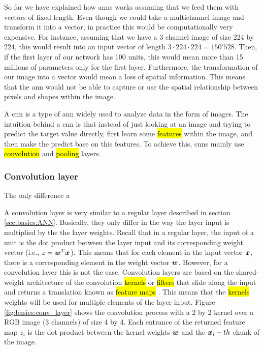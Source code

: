 
\glsresetall

\graphicspath{{./Sections/Basics/Resources/}}

So far we have explained how \glspl{ann} works assuming that we feed them with vectors of fixed length. Even though we could take a multichannel image and transform it into a vector, in practice this would be computationally very expensive. For instance, assuming that we have a 3 channel image of size 224 by 224, this would result into an input vector of length $3 \cdot 224 \cdot 224=150'528$. Then, if the first layer of our network has 100 units, this would mean more than 15 millions of parameters only for the first layer. Furthermore, the transformation of our image into a vector would mean a loss of spatial information. This means that the \gls{ann} would not be able to capture or use the spatial relationship between pixels and shapes within the image.

A \gls{cnn} is a type of \gls{ann} widely used to analyze data in the form of images. The intuition behind a \gls{cnn} is that instead of just looking at an image and trying to predict the target value directly, first learn some \hl{features} within the image, and then make the predict base on this features.
To achieve this, \glspl{cnn} mainly use \hl{convolution} and \hl{pooling} layers.

\subsubsection{Convolution layer}

The only difference a

A convolution layer is very similar to a regular layer described in section \ref{sec:basics:ANN}. Basically, they only differ in the way the layer input is multiplied by the the layer weights.
Recall that in a regular layer, the input of a unit is the dot product between the layer input and its corresponding weight vector (i.e., $z=\boldsymbol{w}^T\boldsymbol{x}$).
This means that for each element in the input vector $\boldsymbol{x}$, there is a corresponding element in the weight vector $\boldsymbol{w}$. However, for a convolution layer this is not the case.
Convolution layers are based on the shared-weight architecture of the convolution \hl{kernels} or \hl{filters} that slide along the input and returns a translation known as \hl{feature maps} \cite{zhang1988shift}. This means that the \hl{kernels} weights will be used for multiple elements of the layer input. Figure \ref{fig:basics:conv_layer} shows the convolution process with a 2 by 2 kernel over a RGB image (3 channels) of size 4 by 4. Each entrance of the returned feature map $z_i$ is the dot product between the kernel weights $\boldsymbol{w}$ and the $\boldsymbol{x}_i-th$ chunk of the image.


